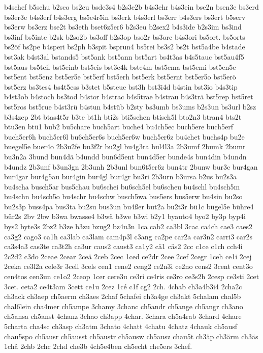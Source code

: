 {b4schef
b5schu
b2sco
bs2cu
bsde3s4
b2s3e2b
b4s3ehr
b4s3ein
bse2n
bsen3e
bs3erd
bs3er3e
b4s3erf
b4s3erg
bs5e4r5in
bs3erk
b4s3erl
bs3err
b4s3ers
bs3ert
b5serv
bs3erw
bs3erz
bse2t
bs3eth
bset6z5er6
b2s3eu
b2sex2
b4s3ide
b2s3im
bs3ind
bs3inf
bs5inte
b2sk
b2so2b
bs3off
b2s3op
bso2r
bs3orc
b4s3ori
bs5ort.
bs5orts
bs2öf
bs2pe
b4speri
bs2ph
b3spit
bsprun4
bs5rei
bs3s2
bs2t
bst5a4be
b4stade
bst3ak
b4st3al
bstands5
bst5ank
bst5ann
bst5art
bs4t3as
b4s5tauc
bst5au4f5
bst5aus
bs5teil
bst5einb
bst5eis
bst3e4k
bste4m
bst5ema
bst5emi
bst5en5e
bst5ent
bst5enz
bst5er5e
bst5erf
bst5erh
bst5erk
bst5ernt
bst5er5o
bst5erö
bst5erz
bs3tes4
bs4t5ess
b3stet
b5steue
bst3h
bst3i4d
b4stin
bst3io
b4s3tip
b4st3ob
b4stoch
bs3tod
b4stor
b4strac
b4s5trae
b4strau
b4s3trä
bst5rep
bst5ret
bst5ros
bst5rue
b4st3rü
b4stun
b4stüb
b2sty
bs3umb
bs3ums
b2s3un
bs3url
b2sz
b3s4zep
2bt
btas4t5r
b3te
bt1h
bti2s
bti5schen
btisch5l
bto2n3
btran4
bts2t
btu3en
btü1
bub2
bu5chare
buch5art
buche4
bu4ch5ec
buch5ere
buch5erf
buch5er6h
buch5er6l
bu6ch5er6s
buch5er6w
buch5er6z
bu4chet
buchs4p
bu2e
buegel5e
buer4o
2b3u2fe
bu3f2r
bu2gl
bu4g3ra
bul4l3a
2b3umf
2bumk
2bumr
bu3n2a
3bund
bun4dä
b4undd
bun6d5ent
bun4d5er
bunde4s
bun4din
b4undn
b4undz
2b3unf
b3un3gn
2b3unh
2b3unl
bun6t5er6z
bun4tr
2bunw
bur3c
bur4gan
bur4gar
bur4g5au
bur4gin
bur4gl
bur4gr
bu3ri
2b3urn
b3ursa
b2us
bu2s3a
bu4scha
busch5ar
bus5chau
bu6schei
bu6sch5el
bu6scheu
bu4schl
bu4sch5m
bu4schn
bu4sch5o
bu4schr
bu4schw
busch5wa
bus5ers
bus5erw
bu4sin
bu2so
bu2s3p
buss4pa
bus3ta
bu2su
bus3un
bu4ßer
but2a
bu2t3r
bü1c
bügel5e
bühre4
bür2s
2bv
2bw
b3wa
bwasse4
b3wä
b3we
b3wi
b2y1
byauto4
byo2
by3p
byp4i
bys2
byte3s
2bz2
b3ze
b3zu
bzug2
bz4u3n
1ca
cab2
ca3bl
3cac
ca4ch
cae3
caes2
ca3g2
cago3
ca1h
ca3lab
ca3lam
cam4p3l
c3ang
ca2pe
car2a
car3n2
carri3
car2s
ca3s4a3
cas3te
ca3t2h
ca3ur
caus2
caust3
ca1y2
cä1
cäs2
2cc
c1ce
c1ch
cch4i
2c2d2
c3do
2ceae
2cear
2ceä
2ceb
2cec
1ced
ce2dr
2cee
2cef
2cegr
1ceh
ce1i
2cej
2ceka
ce3l2a
cele3r
3cell
3cels
cen1
cene2
ceng2
ce2n3i
ce2no
cens2
3cent
cent3o
cen4tos
cen3un
ce1o2
2ceop
1cer
cere3u
ce3ri
ce4ris
ce3ro
ce3s2h
2cesp
ce3sti
2cet
3cet.
ceta2
ce4t3am
3cett
ce1u
2cez
1cé
c1f
cg2
2ch.
4chab
ch3a4b3i4
2cha2c
ch3ack
ch3aep
ch5aerm
ch3aes
2chaf
5chafei
ch3a4ge
ch3akt
5chalam
chal5b
chal6lein
cha4mer
ch5ampe
3chamy
3chanc
ch5andr
ch5ange
ch5angr
ch3ano
ch5ansa
ch5anst
4chanz
3chao
ch3app
4char.
3chara
ch5a4rab
3chard
4chare
5charta
cha4sc
ch3asp
ch3atm
3chato
4chatt
4chatu
4chatz
4chauk
ch5ausf
chau5spo
ch5ausr
ch5ausst
ch5austr
ch5ausw
ch5ausz
chau5t
ch3äp
ch3ärm
ch3äs
1châ
2chb
2chc
2chd
che3b
4ch5e4ben
ch5echt
che5ers
3chef.
}
